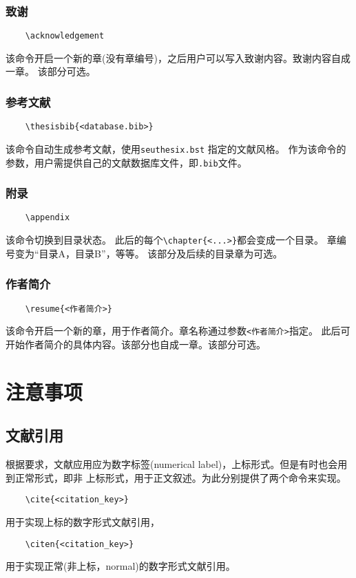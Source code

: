 \documentclass[figurelist,tablelist,algorithmlist,nomlist,masters]{seuthesix}
\begin{document}
\subsection{致谢}
{\color{magenta}
	\begin{verbatim}
	\acknowledgement
	\end{verbatim}
}
该命令开启一个新的章(没有章编号)，之后用户可以写入致谢内容。致谢内容自成一章。
该部分可选。
\subsection{参考文献}
{\color{magenta}
	\begin{verbatim}
	\thesisbib{<database.bib>}
	\end{verbatim}
}
该命令自动生成参考文献，使用\texttt{seuthesix.bst} 指定的文献风格。
作为该命令的参数，用户需提供自己的文献数据库文件，即\texttt{.bib}文件。

\subsection{附录}
{\color{magenta}
	\begin{verbatim}
	\appendix
	\end{verbatim}
}
该命令切换到目录状态。
此后的每个\verb+\chapter{<...>}+都会变成一个目录。
章编号变为“目录A，目录B”，等等。
该部分及后续的目录章为可选。
\subsection{作者简介}
{\color{magenta}
	\begin{verbatim}
	\resume{<作者简介>}
	\end{verbatim}
}
该命令开启一个新的章，用于作者简介。章名称通过参数\texttt{<作者简介>}指定。
此后可开始作者简介的具体内容。该部分也自成一章。该部分可选。


\chapter{注意事项}
\section{文献引用}
根据要求，文献应用应为数字标签(numerical label)，上标形式。但是有时也会用到正常形式，即非
上标形式，用于正文叙述。为此分别提供了两个命令来实现。
{\color{magenta}
	\begin{verbatim}
	\cite{<citation_key>}
	\end{verbatim}
}
用于实现上标的数字形式文献引用\cite{knuth}，
{\color{magenta}
	\begin{verbatim}
	\citen{<citation_key>}
	\end{verbatim}
}
用于实现正常(非上标，normal)的数字形式文献引用。
\end{document}
